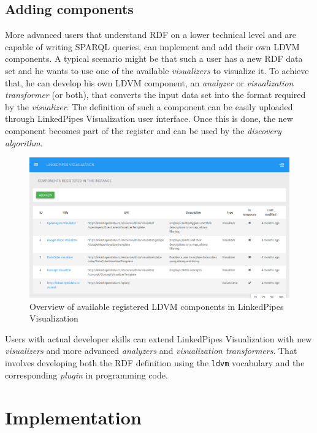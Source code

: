 \subsection{Adding components}

More advanced users that understand RDF on a lower technical level and are capable of writing SPARQL queries, can implement and add their own LDVM components. A typical scenario might be that such a user has a new RDF data set and he wants to use one of the available \emph{visualizers} to visualize it. To achieve that, he can develop his own LDVM component, an \emph{analyzer} or \emph{visualization transformer} (or both), that converts the input data set into the format required by the \emph{visualizer}. The definition of such a component can be easily uploaded through LinkedPipes Visualization user interface. Once this is done, the new component becomes part of the register and can be used by the \emph{discovery algorithm}.

\begin{figure}
	\centering
	\includegraphics[width=130mm]{img/03_linked_pipes_components.png}
	\caption{Overview of available registered LDVM components in LinkedPipes Visualization} 
	\label{fig:linked-pipes-components}
\end{figure}

Users with actual developer skills can extend LinkedPipes Visualization with new \emph{visualizers} and more advanced \emph{analyzers} and \emph{visualization transformers}. That involves developing both the RDF definition using the \texttt{ldvm} vocabulary and the corresponding \emph{plugin} in programming code. 

\section{Implementation}

